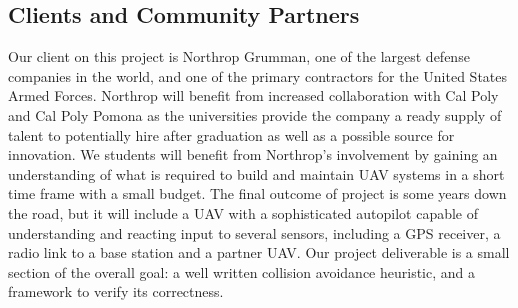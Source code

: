\documentclass[12pt]{article}
\begin{document}
\subsection{Clients and Community Partners}
   Our client on this project is Northrop Grumman, one of the largest defense companies in the world, and one of the primary contractors for the United States Armed Forces. Northrop will benefit from increased collaboration with Cal Poly and Cal Poly Pomona as the universities provide the company a ready supply of talent to potentially hire after graduation as well as a possible source for innovation. We students will benefit from Northrop’s involvement by gaining an understanding of what is required to build and maintain UAV systems in a short time frame with a small budget. The final outcome of project is some years down the road, but it will include a UAV with a sophisticated autopilot capable of understanding and reacting input to several sensors, including a GPS receiver, a radio link to a base station and a partner UAV. Our project deliverable is a small section of the overall goal: a well written collision avoidance heuristic, and a framework to verify its correctness. 
\end{document}
